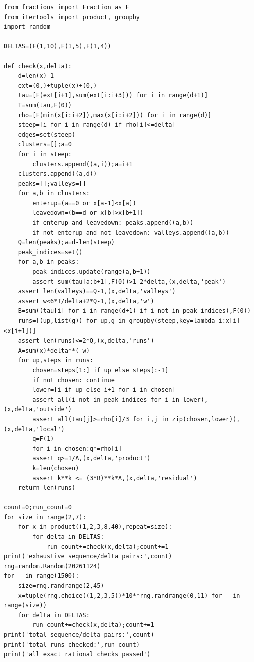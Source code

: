\documentclass[11pt]{amsart}
\theoremstyle{definition}
\theoremstyle{remark}
\begin{document}
\begin{Verbatim}[fontsize=\scriptsize,baselinestretch=1.0]
from fractions import Fraction as F
from itertools import product, groupby
import random

DELTAS=(F(1,10),F(1,5),F(1,4))

def check(x,delta):
    d=len(x)-1
    ext=(0,)+tuple(x)+(0,)
    tau=[F(ext[i+1],sum(ext[i:i+3])) for i in range(d+1)]
    T=sum(tau,F(0))
    rho=[F(min(x[i:i+2]),max(x[i:i+2])) for i in range(d)]
    steep=[i for i in range(d) if rho[i]<=delta]
    edges=set(steep)
    clusters=[];a=0
    for i in steep:
        clusters.append((a,i));a=i+1
    clusters.append((a,d))
    peaks=[];valleys=[]
    for a,b in clusters:
        enterup=(a==0 or x[a-1]<x[a])
        leavedown=(b==d or x[b]>x[b+1])
        if enterup and leavedown: peaks.append((a,b))
        if not enterup and not leavedown: valleys.append((a,b))
    Q=len(peaks);w=d-len(steep)
    peak_indices=set()
    for a,b in peaks:
        peak_indices.update(range(a,b+1))
        assert sum(tau[a:b+1],F(0))>1-2*delta,(x,delta,'peak')
    assert len(valleys)==Q-1,(x,delta,'valleys')
    assert w<6*T/delta+2*Q-1,(x,delta,'w')
    B=sum((tau[i] for i in range(d+1) if i not in peak_indices),F(0))
    runs=[(up,list(g)) for up,g in groupby(steep,key=lambda i:x[i]<x[i+1])]
    assert len(runs)<=2*Q,(x,delta,'runs')
    A=sum(x)*delta**(-w)
    for up,steps in runs:
        chosen=steps[1:] if up else steps[:-1]
        if not chosen: continue
        lower=[i if up else i+1 for i in chosen]
        assert all(i not in peak_indices for i in lower),(x,delta,'outside')
        assert all(tau[j]>=rho[i]/3 for i,j in zip(chosen,lower)),(x,delta,'local')
        q=F(1)
        for i in chosen:q*=rho[i]
        assert q>=1/A,(x,delta,'product')
        k=len(chosen)
        assert k**k <= (3*B)**k*A,(x,delta,'residual')
    return len(runs)

count=0;run_count=0
for size in range(2,7):
    for x in product((1,2,3,8,40),repeat=size):
        for delta in DELTAS:
            run_count+=check(x,delta);count+=1
print('exhaustive sequence/delta pairs:',count)
rng=random.Random(20261124)
for _ in range(1500):
    size=rng.randrange(2,45)
    x=tuple(rng.choice((1,2,3,5))*10**rng.randrange(0,11) for _ in range(size))
    for delta in DELTAS:
        run_count+=check(x,delta);count+=1
print('total sequence/delta pairs:',count)
print('total runs checked:',run_count)
print('all exact rational checks passed')

\end{Verbatim}
\end{document}
